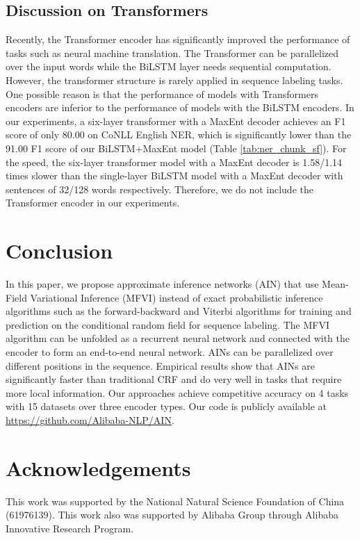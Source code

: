 \documentclass[11pt,a4paper]{article}
\begin{document}
\subsection{Discussion on Transformers}
Recently, the Transformer \citep{NIPS2017_7181} encoder has significantly improved the performance of tasks such as neural machine translation. The Transformer can be parallelized over the input words while the BiLSTM layer needs sequential computation. However, the transformer structure is rarely applied in sequence labeling tasks. One possible reason is that the performance of models with Transformers encoders are inferior to the performance of models with the BiLSTM encoders. In our experiments, a six-layer transformer with a MaxEnt decoder achieves an F1 score of only 80.00 on CoNLL English NER, which is significantly lower than the 91.00 F1 score of our BiLSTM+MaxEnt model (Table \ref{tab:ner_chunk_sf}). For the speed, the six-layer transformer model with a MaxEnt decoder is 1.58/1.14 times slower than the single-layer BiLSTM model with a MaxEnt decoder with sentences of 32/128 words respectively. Therefore, we do not include the Transformer encoder in our experiments.



\section{Conclusion}
In this paper, we propose approximate inference networks (AIN) that use Mean-Field Variational Inference (MFVI) instead of exact probabilistic inference algorithms such as the forward-backward and Viterbi algorithms for training and prediction on the conditional random field for sequence labeling. The MFVI algorithm can be unfolded as a recurrent neural network and connected with the encoder to form an end-to-end neural network. AINs can be parallelized over different positions in the sequence. Empirical results show that AINs are significantly faster than traditional CRF and do very well in tasks that require more local information. Our approaches achieve competitive accuracy on 4 tasks with 15 datasets over three encoder types. Our code is publicly available at \url{https://github.com/Alibaba-NLP/AIN}.
\section*{Acknowledgements}
This work was supported by the National Natural Science Foundation of China (61976139). This work also was supported by Alibaba Group through Alibaba Innovative Research Program. 
\end{document}
